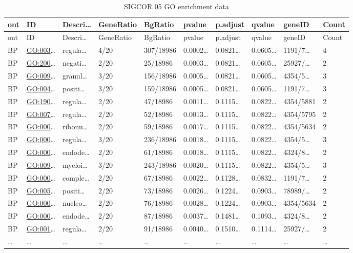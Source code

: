 \documentclass[
]{article}
\begin{document}
\begin{longtable}[]{@{}llllllllll@{}}
\caption{\label{tab:SIGCOR-05-GO-enrichment-data}SIGCOR 05 GO enrichment data}\tabularnewline
\toprule
ont & ID & Descri\ldots{} & GeneRatio & BgRatio & pvalue & p.adjust & qvalue & geneID & Count\tabularnewline
\midrule
\endfirsthead
\toprule
ont & ID & Descri\ldots{} & GeneRatio & BgRatio & pvalue & p.adjust & qvalue & geneID & Count\tabularnewline
\midrule
\endhead
BP & \url{GO:003}\ldots{} & regula\ldots{} & 4/20 & 307/18986 & 0.0002\ldots{} & 0.0821\ldots{} & 0.0605\ldots{} & 1191/7\ldots{} & 4\tabularnewline
BP & \url{GO:200}\ldots{} & negati\ldots{} & 2/20 & 25/18986 & 0.0003\ldots{} & 0.0821\ldots{} & 0.0605\ldots{} & 25927/\ldots{} & 2\tabularnewline
BP & \url{GO:009}\ldots{} & granul\ldots{} & 3/20 & 156/18986 & 0.0005\ldots{} & 0.0821\ldots{} & 0.0605\ldots{} & 4354/5\ldots{} & 3\tabularnewline
BP & \url{GO:004}\ldots{} & positi\ldots{} & 3/20 & 159/18986 & 0.0005\ldots{} & 0.0821\ldots{} & 0.0605\ldots{} & 1191/7\ldots{} & 3\tabularnewline
BP & \url{GO:190}\ldots{} & regula\ldots{} & 2/20 & 47/18986 & 0.0011\ldots{} & 0.1115\ldots{} & 0.0822\ldots{} & 4354/5881 & 2\tabularnewline
BP & \url{GO:007}\ldots{} & regula\ldots{} & 2/20 & 52/18986 & 0.0013\ldots{} & 0.1115\ldots{} & 0.0822\ldots{} & 4354/5795 & 2\tabularnewline
BP & \url{GO:000}\ldots{} & ribonu\ldots{} & 2/20 & 59/18986 & 0.0017\ldots{} & 0.1115\ldots{} & 0.0822\ldots{} & 4354/5634 & 2\tabularnewline
BP & \url{GO:000}\ldots{} & regula\ldots{} & 3/20 & 236/18986 & 0.0018\ldots{} & 0.1115\ldots{} & 0.0822\ldots{} & 4354/5\ldots{} & 3\tabularnewline
BP & \url{GO:000}\ldots{} & endode\ldots{} & 2/20 & 61/18986 & 0.0018\ldots{} & 0.1115\ldots{} & 0.0822\ldots{} & 4324/8\ldots{} & 2\tabularnewline
BP & \url{GO:009}\ldots{} & myeloi\ldots{} & 3/20 & 243/18986 & 0.0020\ldots{} & 0.1115\ldots{} & 0.0822\ldots{} & 4354/5\ldots{} & 3\tabularnewline
BP & \url{GO:000}\ldots{} & comple\ldots{} & 2/20 & 67/18986 & 0.0022\ldots{} & 0.1128\ldots{} & 0.0832\ldots{} & 1191/7\ldots{} & 2\tabularnewline
BP & \url{GO:005}\ldots{} & positi\ldots{} & 2/20 & 73/18986 & 0.0026\ldots{} & 0.1224\ldots{} & 0.0903\ldots{} & 78989/\ldots{} & 2\tabularnewline
BP & \url{GO:000}\ldots{} & nucleo\ldots{} & 2/20 & 76/18986 & 0.0028\ldots{} & 0.1224\ldots{} & 0.0903\ldots{} & 4354/5634 & 2\tabularnewline
BP & \url{GO:000}\ldots{} & endode\ldots{} & 2/20 & 87/18986 & 0.0037\ldots{} & 0.1481\ldots{} & 0.1093\ldots{} & 4324/8\ldots{} & 2\tabularnewline
BP & \url{GO:001}\ldots{} & regula\ldots{} & 2/20 & 91/18986 & 0.0040\ldots{} & 0.1510\ldots{} & 0.1114\ldots{} & 25927/\ldots{} & 2\tabularnewline
\ldots{} & \ldots{} & \ldots{} & \ldots{} & \ldots{} & \ldots{} & \ldots{} & \ldots{} & \ldots{} & \ldots{}\tabularnewline
\bottomrule
\end{longtable}
\end{document}
